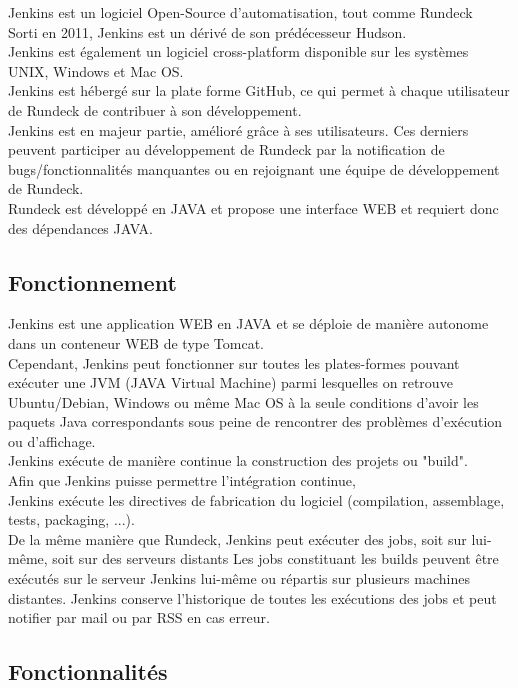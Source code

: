 \documentclass[12pt]{article}
\begin{document}
Jenkins est un logiciel Open-Source d'automatisation, tout comme Rundeck
\\
Sorti en 2011, Jenkins est un dérivé de son prédécesseur Hudson.
\\
Jenkins est également un logiciel cross-platform disponible sur les systèmes UNIX, Windows et Mac OS. 
\\
Jenkins est hébergé sur la plate forme GitHub, ce qui permet à chaque utilisateur de Rundeck de contribuer à son développement. 
\\
Jenkins est en majeur partie, amélioré grâce à ses utilisateurs. Ces derniers peuvent participer au développement de Rundeck par la notification de bugs/fonctionnalités manquantes ou en rejoignant une équipe de développement de Rundeck. 
\\
Rundeck est développé en JAVA et propose une interface WEB et requiert donc des dépendances JAVA.

\subsection{Fonctionnement}

Jenkins est une application WEB en JAVA et se déploie de manière autonome dans un conteneur WEB de type Tomcat.
\\
Cependant, Jenkins peut fonctionner sur toutes les plates-formes pouvant exécuter une JVM (JAVA Virtual Machine) parmi lesquelles on retrouve Ubuntu/Debian, Windows ou même Mac OS à la seule conditions d'avoir les paquets Java correspondants sous peine de rencontrer des problèmes d'exécution ou d'affichage.
\\
Jenkins exécute de manière continue la construction des projets ou "build".
\\ 
Afin que Jenkins puisse permettre l'intégration continue, 
\\
Jenkins exécute les directives de fabrication du logiciel (compilation, assemblage, tests, packaging, ...). 
\\
De la même manière que Rundeck, Jenkins peut exécuter des jobs, soit sur lui-même, soit sur des serveurs distants
Les jobs constituant les builds peuvent être exécutés sur le serveur Jenkins lui-même ou répartis sur plusieurs machines distantes. Jenkins conserve l'historique de toutes les exécutions des jobs et peut notifier par mail ou par RSS en cas erreur.

\subsection{Fonctionnalités}
\end{document}
